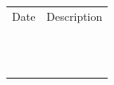 \documentclass[10pt]{article}
\begin{document}
\begin{tabular}{@{}p{1.5in}p{5in}}
Date & Description \\ \\ \\
\underline{\hspace{1.5in}}& \underline{\hspace{5in}} \\
\\ \\
\underline{\hspace{1.5in}}& \underline{\hspace{5in}} \\
\\ \\
\underline{\hspace{1.5in}}& \underline{\hspace{5in}} \\
\\ \\
\underline{\hspace{1.5in}}& \underline{\hspace{5in}} \\
\end{tabular}
\vspace{3in}
\vspace*{\fill}
\end{document}
